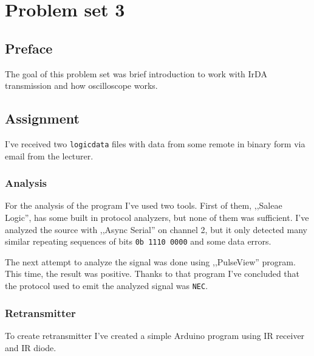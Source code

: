 \section{Problem set 3}
\subsection{Preface}

The goal of this problem set was brief introduction to work with IrDA transmission
and how oscilloscope works.

\subsection{Assignment}

I've received two \texttt{logicdata} files with data from some remote in binary form via email from the lecturer.

\subsubsection{Analysis}

For the analysis of the program I've used two tools. First of them, ,,Saleae Logic'', has some built in protocol analyzers, but none of them was sufficient. I've analyzed the source with ,,Async Serial'' on channel 2, but it only detected many similar repeating sequences of bits \texttt{0b 1110 0000} and some data errors.


The next attempt to analyze the signal was done using ,,PulseView'' program. This time, the result was positive. Thanks to that program I've concluded that the protocol used to emit the analyzed signal was \texttt{NEC}.

\subsubsection{Retransmitter}

To create retransmitter I've created a simple Arduino program using IR receiver and IR diode.

